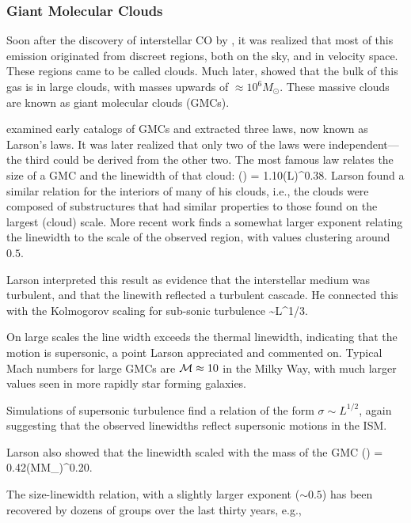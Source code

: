 \documentclass[../dissertation.tex]{subfiles}
\begin{document}
\subsubsection{Giant Molecular Clouds}
Soon after the discovery of interstellar CO by \citet{1970ApJ...161L..43W}, it was realized that most of this emission originated from discreet regions, both on the sky, and in velocity space. These regions came to be called clouds. Much later,
\citet{1987ApJ...319..730S}  showed that the bulk of this gas is in large clouds, with masses upwards of $\approx10^6M_\odot$. 
These massive clouds are known as giant molecular clouds (GMCs).

\citet{1981MNRAS.194..809L} examined early catalogs of GMCs and extracted three laws, now known as Larson's laws. It was later realized that only two of the laws were independent---the third could be derived from the other two. The most famous law relates the size of a GMC and the linewidth of that cloud:
%
\be
\left({\sigma\over \kms}\right) = 1.10\left({L\over \pc}\right)^{0.38}.
\ee
%
Larson found a similar relation for the interiors of many of his clouds, i.e., the clouds were composed of substructures that had similar properties to those found on the largest (cloud) scale.
More recent work finds a somewhat larger exponent relating the linewidth to the scale of the observed region, with values clustering around $0.5$.

Larson interpreted this result as evidence that the interstellar medium was turbulent, and that the linewith reflected a turbulent cascade. 
He connected this with the Kolmogorov scaling for sub-sonic turbulence
%
\be
\sigma\sim L^{1/3}.
\ee
%

On large scales the line width exceeds the thermal linewidth, indicating that the motion is supersonic, a point Larson appreciated and commented on. Typical Mach numbers for large GMCs are ${\cal M}\approx 10$ in the Milky Way, with much larger values seen in more rapidly star forming galaxies.

Simulations of supersonic turbulence find a relation of the form $\sigma\sim L^{1/2}$, again suggesting that the observed linewidths reflect supersonic motions in the ISM.

Larson also showed that the linewidth scaled with the mass of the GMC
%
\be
\left({\sigma\over \kms}\right) = 0.42\left({M\over M_\odot}\right)^{0.20}.
\ee
%

The size-linewidth relation, with a slightly larger exponent ($\sim0.5$) has been recovered by dozens of groups over the last thirty years, e.g., \citet{1987ApJ...319..730S,2008ApJ...679.1338R,2017ApJ...834...57M} 
\end{document}
